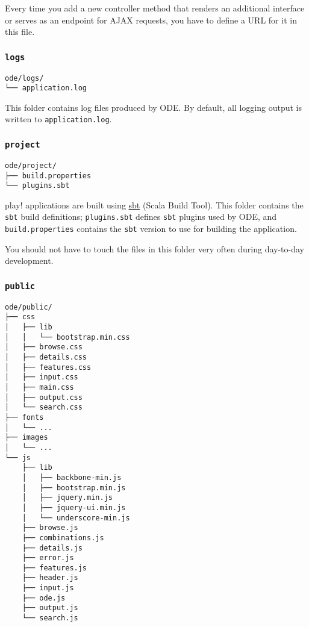 \documentclass[11pt]{article}
\begin{document}
Every time you add a new controller method that renders an
additional interface or serves as an endpoint for AJAX requests,
you have to define a URL for it in this file.

\subsubsection{\texttt{logs}}
\label{sec-3-3-3}
\begin{verbatim}
ode/logs/
└── application.log
\end{verbatim}

This folder contains log files produced by ODE. By default, all
logging output is written to \texttt{application.log}.

\subsubsection{\texttt{project}}
\label{sec-3-3-4}
\begin{verbatim}
ode/project/
├── build.properties
└── plugins.sbt
\end{verbatim}

play! applications are built using \href{http://www.scala-sbt.org/}{sbt} (Scala Build Tool). This
folder contains the \texttt{sbt} build definitions; \texttt{plugins.sbt} defines
\texttt{sbt} plugins used by ODE, and \texttt{build.properties} contains the
\texttt{sbt} version to use for building the application.

You should not have to touch the files in this folder very often
during day-to-day development.

\subsubsection{\texttt{public}}
\label{sec-3-3-5}
\begin{verbatim}
ode/public/
├── css
│   ├── lib
│   │   └── bootstrap.min.css
│   ├── browse.css
│   ├── details.css
│   ├── features.css
│   ├── input.css
│   ├── main.css
│   ├── output.css
│   └── search.css
├── fonts
│   └── ...
├── images
│   └── ...
└── js
    ├── lib
    │   ├── backbone-min.js
    │   ├── bootstrap.min.js
    │   ├── jquery.min.js
    │   ├── jquery-ui.min.js
    │   └── underscore-min.js
    ├── browse.js
    ├── combinations.js
    ├── details.js
    ├── error.js
    ├── features.js
    ├── header.js
    ├── input.js
    ├── ode.js
    ├── output.js
    └── search.js
\end{verbatim}
\end{document}
